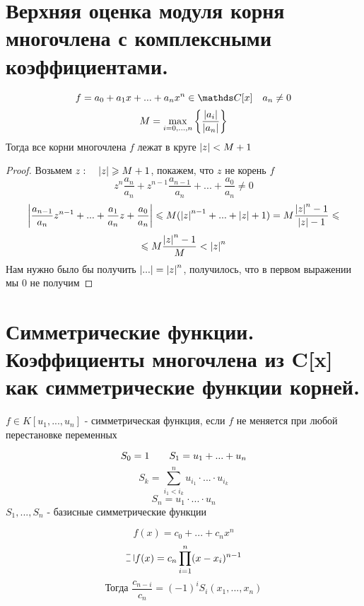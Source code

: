 \documentclass[algebra]{subfiles}
\begin{document}
  \section{Верхняя оценка модуля корня многочлена с комплексными коэффициентами.}

    \begin{Theorem}
        \[f = a_0 + a_1 x + ... + a_n x^n \in \CC [x] \q a_n \neq 0\]
        \[M = \underset{i = 0, ..., n}{\max} \left\{\frac{\left|a_i\right|}{\left|a_n\right|}\right\}\]
        Тогда все корни многочлена $f$ лежат в круге $\left|z\right| < M + 1$
    \end{Theorem}

    \begin{proof}
        Возьмем $z :  \quad \left|z\right| \geqslant M + 1$, покажем, что $z$  не корень $f$
        \[z^n \frac{a_n}{a_n} + z^{n - 1}  \frac{a_{n - 1} }{a_n} + ... + \frac{a_0}{a_n} \neq 0\]
        \[\left|\frac{a_{n - 1} }{a_n} z^{n - 1} + ... + \frac{a_1}{a_n} z  + \frac{a_0}{a_n}\right| \leqslant M(\left|z\right|^{n - 1} + ... + \left|z\right| + 1)
        = M \frac{\left|z\right|^n - 1}{\left|z\right| - 1} \leqslant\]
        \[\leqslant M \frac{\left|z\right|^n - 1}{M} < \left|z\right|^n\]
        Нам нужно было бы получить $\left|...\right| = \left|z\right|^n$, получилось, что в первом выражении мы 0 не получим
    \end{proof}

    \section{Симметрические функции. Коэффициенты многочлена из C[x] как симметрические функции корней.}

    \begin{definition}
        $f \in K[u_1, ..., u_n]$ - симметрическая функция, если $f$ не меняется при любой перестановке переменных
        \begin{Example}
            \[S_0 = 1 \qquad S_1 = u_1 + ... + u_n\]
            \[S_k = \sum_{i_1 < i_k}^n u_{i_1} \cdot ... \cdot u_{i_k}\]
            \[S_n = u_1 \cdot ... \cdot u_n\]
            $S_1,...,S_n$ - базисные симметрические функции
        \end{Example}
    \end{definition}

    \begin{Theorem}[Виета]
        \[f(x) = c_0 + ... + c_n x^n\]
        \[\letus f(x) = c_n \prod_{i=1}^n (x - x_i)^{n-1}\]
        \[\text{Тогда } \frac{c_{n-i}}{c_n} = (-1)^i S_i (x_1,...,x_n)\]
    \end{Theorem}
\end{document}
